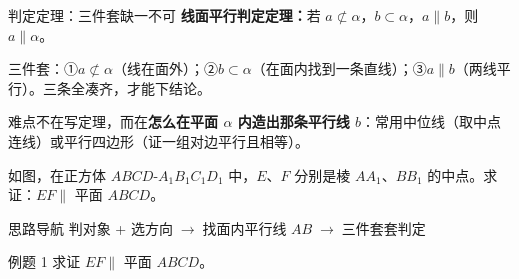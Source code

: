 \documentclass{exam-zh}
\begin{document}
\clearpage
{}


\begin{eduSolutionBox}{判定定理：三件套缺一不可}
  \begingroup
  \setlength{\parskip}{2.5mm}
\textbf{线面平行判定定理：}若 $a\not\subset\alpha$，$b\subset\alpha$，$a\parallel b$，则 $a\parallel\alpha$。\par
三件套：①$ a\not\subset\alpha $（线在面外）；②$ b\subset\alpha $（在面内找到一条直线）；③$ a\parallel b $（两线平行）。三条全凑齐，才能下结论。\par
难点不在写定理，而在\textbf{怎么在平面 $\alpha$ 内造出那条平行线 $b$}：常用中位线（取中点连线）或平行四边形（证一组对边平行且相等）。\par
  \endgroup
\end{eduSolutionBox}




\begin{eduProblemBlock}[例题 1]
\noindent
\begin{minipage}[t]{\dimexpr\linewidth-70mm-6mm\relax}
\vspace{0pt}
如图，在正方体 $ABCD$-$A_{1}B_{1}C_{1}D_{1}$ 中，$E$、$F$ 分别是棱 $AA_{1}$、$BB_{1}$ 的中点。求证：$EF\parallel$ 平面 $ABCD$。

\end{minipage}\hfill
\begin{diagramcoltikz}{70mm}{正方体中观察 E、F 与底面边 AB 的平行关系。}
}
\end{diagramcoltikz}
\end{eduProblemBlock}





\begin{eduAuxItem}{思路导航}
判对象 + 选方向$\;\to\;$找面内平行线 $AB$$\;\to\;$三件套套判定\end{eduAuxItem}




\begin{eduSubQuestionItem}{例题 1}
求证 $EF\parallel$ 平面 $ABCD$。\end{eduSubQuestionItem}
\end{document}
